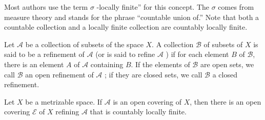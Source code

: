 Most authors use the term \(\sigma\) -locally finite'' for this concept. The \(\sigma\) comes from measure theory and stands for the phrase ``countable union of.'' Note that both a countable collection and a locally finite collection are countably locally finite.

\begin{definition}
 Let \(\mathcal{A}\) be a collection of subsets of the space \(X\). A collection \(\mathcal{B}\) of subsets of \(X\) is said to be a refinement of \(\mathcal{A}\) (or is said to refine \(\mathcal{A}\) ) if for each element \(B\) of \(\mathcal{B}\), there is an element \(A\) of \(\mathcal{A}\) containing \(B\). If the elements of \(\mathcal{B}\) are open sets, we call \(\mathcal{B}\) an open refinement of \(\mathcal{A}\) ; if they are closed sets, we call \(\mathcal{B}\) a closed refinement.
\end{definition}

\begin{lemma}
\label{lem:\thetheorem}
 Let \(X\) be a metrizable space. If \(\mathcal{A}\) is an open covering of \(X\), then there is an open covering \(\mathcal{E}\) of \(X\) refining \(\mathcal{A}\) that is countably locally finite.
\end{lemma}

